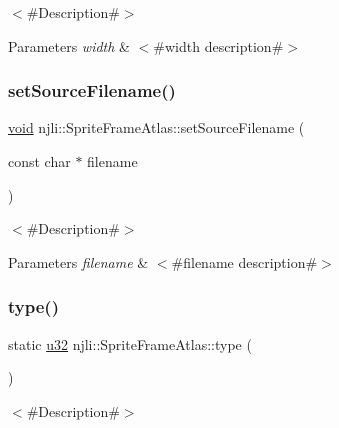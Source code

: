 $<$\#\+Description\#$>$


\begin{DoxyParams}{Parameters}
{\em width} & $<$\#width description\#$>$ \\
\hline
\end{DoxyParams}
\mbox{\label{classnjli_1_1_sprite_frame_atlas_acdb8abdcb12a78faaba9bc8bb03b1813}} 
\subsubsection{\texorpdfstring{set\+Source\+Filename()}{setSourceFilename()}}
{\footnotesize\ttfamily \mbox{\hyperlink{_thread_8h_af1e856da2e658414cb2456cb6f7ebc66}{void}} njli\+::\+Sprite\+Frame\+Atlas\+::set\+Source\+Filename (\begin{DoxyParamCaption}\item[{const char $\ast$}]{filename }\end{DoxyParamCaption})}

$<$\#\+Description\#$>$


\begin{DoxyParams}{Parameters}
{\em filename} & $<$\#filename description\#$>$ \\
\hline
\end{DoxyParams}
\mbox{\label{classnjli_1_1_sprite_frame_atlas_a58bec088ea6c0f9b140dcee287826007}} 
\subsubsection{\texorpdfstring{type()}{type()}}
{\footnotesize\ttfamily static \mbox{\hyperlink{_util_8h_a10e94b422ef0c20dcdec20d31a1f5049}{u32}} njli\+::\+Sprite\+Frame\+Atlas\+::type (\begin{DoxyParamCaption}{ }\end{DoxyParamCaption})\hspace{0.3cm}{\ttfamily [static]}}

$<$\#\+Description\#$>$

